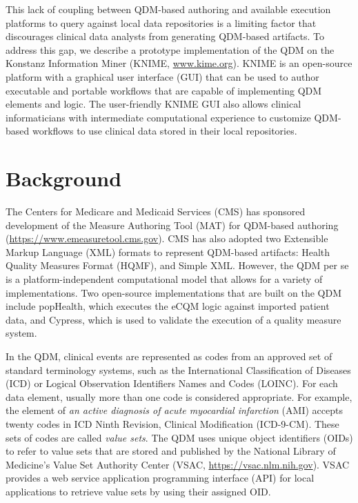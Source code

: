 \documentclass{article}
\begin{document}
This lack of coupling between QDM-based authoring and available execution platforms to query against local data repositories is a limiting factor that discourages clinical data analysts from generating QDM-based artifacts. To address this gap, we describe a prototype implementation of the QDM on the Konstanz Information Miner (KNIME, \url{www.kime.org}). KNIME is an open-source platform with a graphical user interface (GUI) that can be used to author executable and portable workflows that are capable of implementing QDM elements and logic. The user-friendly KNIME GUI also allows clinical informaticians with intermediate computational experience to customize QDM-based workflows to use clinical data stored in their local repositories.

\section{Background}

The Centers for Medicare and Medicaid Services (CMS) has sponsored development of the Measure Authoring Tool (MAT) for QDM-based authoring (\url{https://www.emeasuretool.cms.gov}). CMS has also adopted two Extensible Markup Language (XML) formats to represent QDM-based artifacts: Health Quality Measures Format (HQMF), and Simple XML. However, the QDM per se is a platform-independent computational model that allows for a variety of implementations. Two open-source implementations that are built on the QDM include popHealth, which executes the eCQM logic against imported patient data, and Cypress, which is used to validate the execution of a quality measure system.  

In the QDM, clinical events are represented as codes from an approved set of standard terminology systems, such as the International Classification of Diseases (ICD) or Logical Observation Identifiers Names and Codes (LOINC). For each data element, usually more than one code is considered appropriate. For example, the element of \emph{an active diagnosis of acute myocardial infarction} (AMI) accepts twenty codes in ICD Ninth Revision, Clinical Modification (ICD-9-CM). These sets of codes are called \emph{value sets}. The QDM uses unique object identifiers (OIDs) to refer to value sets that are stored and published by the National Library of Medicine's Value Set Authority Center (VSAC, \url{https://vsac.nlm.nih.gov}). VSAC provides a web service application programming interface (API) for local applications to retrieve value sets by using their assigned OID.
\end{document}
